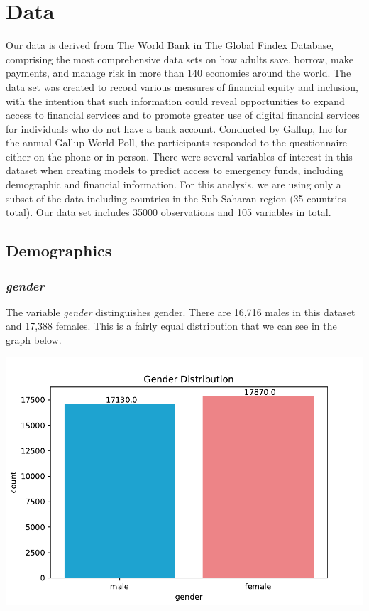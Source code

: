 \documentclass[water,article,submit,moreauthors,pdftex]{mdpi}
\begin{document}
\hypertarget{data}{%
\section{Data}\label{data}}

Our data is derived from The World Bank in The Global Findex Database,
comprising the most comprehensive data sets on how adults save, borrow,
make payments, and manage risk in more than 140 economies around the
world. The data set was created to record various measures of financial
equity and inclusion, with the intention that such information could
reveal opportunities to expand access to financial services and to
promote greater use of digital financial services for individuals who do
not have a bank account. Conducted by Gallup, Inc for the annual Gallup
World Poll, the participants responded to the questionnaire either on
the phone or in-person. There were several variables of interest in this
dataset when creating models to predict access to emergency funds,
including demographic and financial information. For this analysis, we
are using only a subset of the data including countries in the
Sub-Saharan region (35 countries total). Our data set includes 35000
observations and 105 variables in total.

\hypertarget{demographics}{%
\subsection{Demographics}\label{demographics}}

\hypertarget{gender}{%
\subsubsection{\texorpdfstring{\emph{gender}}{gender}}\label{gender}}

The variable \emph{gender} distinguishes gender. There are 16,716 males
in this dataset and 17,388 females. This is a fairly equal distribution
that we can see in the graph below.

\includegraphics{term_paper_files/figure-latex/unnamed-chunk-6-1.pdf}
\end{document}

